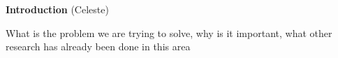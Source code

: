 \textbf{Introduction} (Celeste)
     
     What is the problem we are trying to solve, why is it important, what other research has already been done in this area